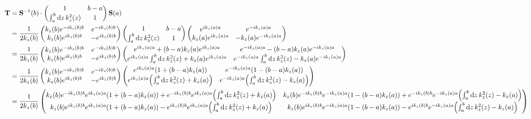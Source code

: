 \begin{align*}
	\vb{T} &= \vb{S}^{-1}\pqty{b}\cdot \pmqty{1 & b-a \\ \int_a^b \dd{z} k_{z}^2\pqty{z} & 1}\vb{S}\pqty{a} \\
	&=
	\frac{1}{2k_z\pqty{b}} 
	\pmqty{
		k_z\pqty{b} e^{-ik_z\pqty{b}b} &
		e^{-ik_z\pqty{b}b}  \\
		k_z\pqty{b} e^{ik_z\pqty{b}b} & 
		-e^{ik_z\pqty{b}b}
		}
	\pmqty{1 & b-a \\ \int_a^b \dd{z} k_{z}^2\pqty{z} & 1}
	\pmqty{
		e^{ik_z\pqty{a}a} & 
		e^{-ik_z\pqty{a}a}  \\
		k_z\pqty{a} e^{ik_z\pqty{a}a} & 
		-k_z\pqty{a} e^{-ik_z\pqty{a}a}
		} \\
	&=
	\frac{1}{2k_z\pqty{b}} 
	\pmqty{
		k_z\pqty{b} e^{-ik_z\pqty{b}b} &
		e^{-ik_z\pqty{b}b}  \\
		k_z\pqty{b} e^{ik_z\pqty{b}b} & 
		-e^{ik_z\pqty{b}b}
		}
	\pmqty{
		e^{ik_z\pqty{a}a} +  \pqty{b-a} k_z\pqty{a} e^{ik_z\pqty{a}a} &
		e^{-ik_z\pqty{a}a} - \pqty{b-a}k_z\pqty{a} e^{-ik_z\pqty{a}a} \\
		e^{ik_z\pqty{a}a}\int_a^b \dd{z} k_{z}^2\pqty{z} + k_z\pqty{a} e^{ik_z\pqty{a}a} &
		e^{-ik_z\pqty{a}a}\int_a^b \dd{z} k_{z}^2\pqty{z} -k_z\pqty{a} e^{-ik_z\pqty{a}a}
		} \\
	&=
	\frac{1}{2k_z\pqty{b}} 
	\pmqty{
		k_z\pqty{b} e^{-ik_z\pqty{b}b} &
		e^{-ik_z\pqty{b}b}  \\
		k_z\pqty{b} e^{ik_z\pqty{b}b} & 
		-e^{ik_z\pqty{b}b}
		}
	\pmqty{
		e^{ik_z\pqty{a}a}\pqty{1 +  \pqty{b-a} k_z\pqty{a} } &
		e^{-ik_z\pqty{a}a}\pqty{1 - \pqty{b-a}k_z\pqty{a} } \\
		e^{ik_z\pqty{a}a}\pqty{\int_a^b \dd{z} k_{z}^2\pqty{z} + k_z\pqty{a} } &
		e^{-ik_z\pqty{a}a}\pqty{\int_a^b \dd{z} k_{z}^2\pqty{z} -k_z\pqty{a} }
		} \\
	&=
	\frac{1}{2k_z\pqty{b}} 
	\pmqty{
		k_z\pqty{b} e^{-ik_z\pqty{b}b}e^{ik_z\pqty{a}a}\pqty{1 +  \pqty{b-a} k_z\pqty{a} } + e^{-ik_z\pqty{b}b}e^{ik_z\pqty{a}a}\pqty{\int_a^b \dd{z} k_{z}^2\pqty{z} + k_z\pqty{a} } &
		k_z\pqty{b} e^{-ik_z\pqty{b}b}e^{-ik_z\pqty{a}a}\pqty{1 - \pqty{b-a}k_z\pqty{a} } + e^{-ik_z\pqty{b}b}e^{-ik_z\pqty{a}a}\pqty{\int_a^b \dd{z} k_{z}^2\pqty{z} -k_z\pqty{a} }  \\
		k_z\pqty{b} e^{ik_z\pqty{b}b}e^{ik_z\pqty{a}a}\pqty{1 +  \pqty{b-a} k_z\pqty{a} } - e^{ik_z\pqty{b}b}e^{ik_z\pqty{a}a}\pqty{\int_a^b \dd{z} k_{z}^2\pqty{z} + k_z\pqty{a} } &
		k_z\pqty{b} e^{ik_z\pqty{b}b}e^{-ik_z\pqty{a}a}\pqty{1 - \pqty{b-a}k_z\pqty{a} } - e^{ik_z\pqty{b}b}e^{-ik_z\pqty{a}a}\pqty{\int_a^b \dd{z} k_{z}^2\pqty{z} -k_z\pqty{a} }
}
\end{align*}
